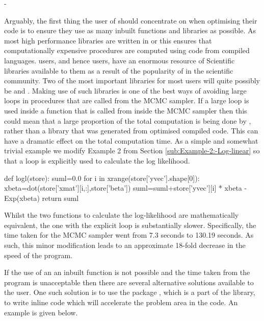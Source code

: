 -\documentclass[article]{jss}
\begin{document}
Arguably, the first thing the user of  should concentrate
on when optimising their  code is to ensure they use as
many inbuilt functions and libraries as possible. As most high
performance libraries are written in  or
 this ensures that computationally expensive
procedures are computed using code from compiled languages.
 users, and hence  users, have an
enormous resource of Scientific libraries available to them as a
result of the popularity of  in the scientific
community. Two of the most important libraries for most users will
quite possibly be  and . Making use of such
libraries is one of the best ways of avoiding large loops in
procedures that are called from the MCMC sampler. If a large loop is
used inside a function that is called from inside the MCMC sampler
then this could mean that a large proportion of the total computation
is being done by , rather than a library that was
generated from optimised compiled code. This can have a dramatic
effect on the total computation time. As a simple and somewhat trivial
example we modify Example 2 from Section \ref{sub:Example-2:-Log-linear}
so that a loop is explicitly used to calculate the log likelihood.




\begin{Code}
def logl(store):
    suml=0.0
    for i in xrange(store['yvec'].shape[0]):
        xbeta=dot(store['xmat'][i,:],store['beta'])
        suml=suml+store['yvec'][i] * xbeta - Exp(xbeta)
    return suml
\end{Code}

Whilst the two functions to calculate the log-likelihood are
mathematically equivalent, the one with the explicit loop is
substantially slower.  Specifically, the time taken for the MCMC
sampler went from 7.3 seconds to 130.19 seconds. As such, this minor
modification leads to an approximate 18-fold decrease in the speed of
the program.

If the use of an an inbuilt function is not possible and the time
taken from the program is unacceptable then there are several
alternative solutions available to the user. One such solution is to
use the package , which is a part of the 
library, to write inline  code which will accelerate the
problem area in the code. An example is given below.
\end{document}
